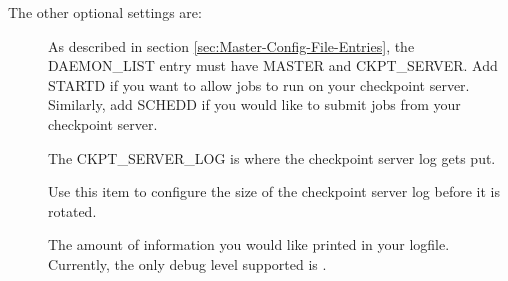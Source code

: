 The other optional settings are:
\begin{description}

\item[] As described in section \ref{sec:Master-Config-File-Entries},
the DAEMON\_LIST entry must have MASTER and CKPT\_SERVER.
Add STARTD if you want to allow jobs to run on your checkpoint server.
Similarly, add SCHEDD if you would like to submit jobs from your checkpoint server.

\item[] The CKPT\_SERVER\_LOG is where the
checkpoint server log gets put.

\item[] Use this item to configure the
size of the checkpoint server log before it is rotated.

\item[] The amount of information you would like printed
in your logfile.
Currently, the only debug level supported is
.

\end{description}
